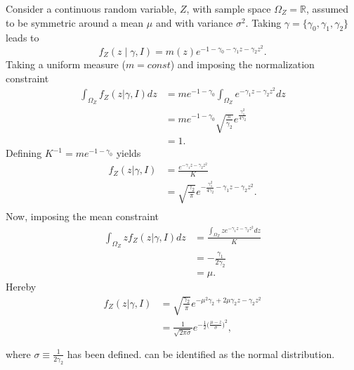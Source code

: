 \newpage
\begin{example}
	Consider a continuous random variable, $Z$, with sample space $\Omega_Z=\mathbb{R}$, assumed to be symmetric around a mean $\mu$ and with variance $\sigma^2$. Taking $\gamma = \{\gamma_0,\gamma_1,\gamma_2\}$ leads to 
	\begin{equation}
			f_Z(z \mid \gamma, I)= m(z) e^{-1 - \gamma_0 - \gamma_1z-\gamma_2z^2}.
	\end{equation}
	Taking a uniform measure ($m= const$) and imposing the normalization constraint
	\begin{equation}
		\begin{split}
			\int_{\Omega_Z} f_Z(z|\gamma,I) dz &= me^{-1-\gamma_0}\int_{\Omega_Z} e^{-\gamma_1z-\gamma_2z^2} dz\\
			&= me^{-1-\gamma_0}\sqrt{\frac{\pi}{\gamma_2}}e^{\frac{\gamma_1^2}{4\gamma_2}}\\
			&=1.
		\end{split}
	\end{equation}
	Defining $K^{-1} = me^{-1-\gamma_0}$ yields
	\begin{equation}
		\begin{split}
			f_Z(z|\gamma,I) &= \frac{e^{-\gamma_1z-\gamma_2z^2}}{K}\\
			&= \sqrt{\frac{\gamma_2}{\pi}}e^{-\frac{\gamma_1^2}{4\gamma_2}-\gamma_1z-\gamma_2z^2}.\\
		\end{split}
	\end{equation}
	Now, imposing the mean constraint
	\begin{equation}
		\begin{split}
			\int_{\Omega_Z} zf_Z(z|\gamma,I) dz &= \frac{\int_{\Omega_Z} ze^{-\gamma_1z-\gamma_2z^2}dz}{K}\\
			&= -\frac{\gamma_1}{2\gamma_2}\\
			&=\mu.
		\end{split}
	\end{equation}
	Hereby
	\begin{equation}
		\begin{split}
			f_Z(z|\gamma,I) &= \sqrt{\frac{\gamma_2}{\pi}}e^{-\mu^2\gamma_2+2\mu \gamma_2z-\gamma_2z^2}\\
			&= \frac{1}{\sqrt{2\pi\sigma}}e^{-\frac{1}{2}\big(\frac{\mu-z}{\sigma}\big)^2},\\\\
		\end{split}
		\label{eq:norm1}
	\end{equation}
	where $\sigma\equiv \frac{1}{2\gamma_2}$ has been defined.  can be identified as the normal distribution.
\end{example}

